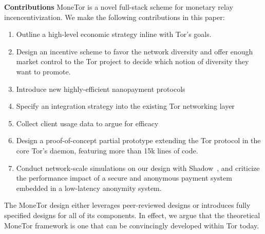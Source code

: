 \textbf{Contributions} MoneTor is a novel full-stack scheme for monetary relay
incencentivization. We make the following contributions in this paper:

\begin{enumerate}
\item Outline a high-level economic strategy inline with Tor's goals.
\item Design an incentive scheme to favor the network diversity and offer enough market control to the Tor project to decide which notion of diversity they want to promote.
\item Introduce new highly-efficient nanopayment protocols
\item Specify an integration strategy into the existing Tor networking layer
\item Collect client usage data to argue for efficacy
\item Design a proof-of-concept partial prototype extending the Tor protocol in the core Tor's daemon, featuring more than 15k lines of code.
\item Conduct network-scale simulations on our design with Shadow~\cite{}, and criticize the performance impact of a secure and anonymous payment system embedded in a low-latency anonymity system.
\end{enumerate}

The MoneTor design either leverages peer-reviewed designs or introduces fully
specified designs for all of its components. In effect, we argue that the
theoretical MoneTor framework is one that can be convincingly developed within
Tor today.